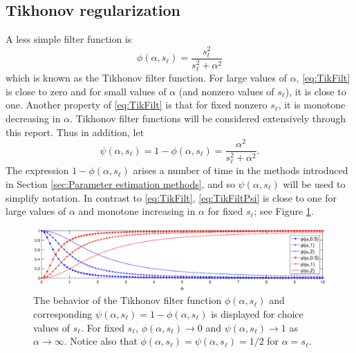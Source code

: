 \documentclass[12pt]{article}
\newcommand{\regparam}{\alpha}
\newcommand{\filt}{\phi}
\newcommand{\mfilt}{\psi}
\newcommand{\singular}{s}	%
\begin{document}
\subsection{Tikhonov regularization} \label{sec:Tikhonov reg.}

A less simple filter function is
\begin{equation}
\filt(\regparam,\singular_\ell)  = \frac{\singular_\ell^2}{\singular_\ell^2 + \regparam^2}
\label{eq:TikFilt}
\end{equation}
which is known as the Tikhonov filter function. For large values of $\regparam$, \eqref{eq:TikFilt} is close to zero and for small values of $\regparam$ (and nonzero values of $\singular_\ell$), it is close to one. Another property of \eqref{eq:TikFilt} is that for fixed nonzero $\singular_\ell$, it is monotone decreasing in $\regparam$. Tikhonov filter functions will be considered extensively through this report. Thus in addition, let
\begin{equation}
\mfilt(\regparam,\singular_\ell) = 1 - \filt(\regparam,\singular_\ell) = \frac{\regparam^2}{\singular_\ell^2 + \regparam^2}.
\label{eq:TikFiltPsi}
\end{equation}
The expression $1 - \filt(\regparam,\singular_\ell)$ arises a number of time in the methods introduced in Section \ref{sec:Parameter estimation methods}, and so $\mfilt(\regparam,\singular_\ell)$ will be used to simplify notation. In contrast to \eqref{eq:TikFilt}, \eqref{eq:TikFiltPsi} is close to one for large values of $\regparam$ and monotone increasing in $\regparam$ for fixed $\singular_\ell$; see Figure \ref{fig:Phi Psi Plot}. \par 

\begin{figure}
	\centerline{\includegraphics[scale = 0.4]{Figures/Phi_Psi_Plot.eps}}
\caption{The behavior of the Tikhonov filter function $\filt(\regparam,\singular_\ell)$ and corresponding $\mfilt(\regparam,\singular_\ell) = 1 - \filt(\regparam,\singular_\ell)$ is displayed for choice values of $\singular_\ell$. For fixed $\singular_\ell$, $\filt(\regparam,\singular_\ell) \rightarrow 0$ and $\mfilt(\regparam,\singular_\ell) \rightarrow 1$ as $\regparam \rightarrow \infty$. Notice also that $\filt(\regparam,\singular_\ell) = \mfilt(\regparam,\singular_\ell) = 1/2$ for $\alpha = \singular_\ell$.}
\label{fig:Phi Psi Plot}
\end{figure}
\end{document}
